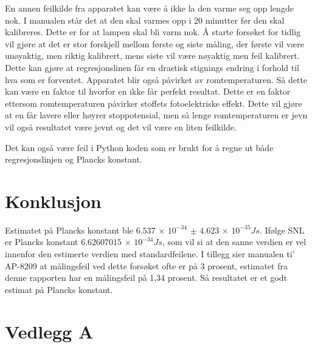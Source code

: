 \documentclass[twocolumn, 11pt]{article} %
\begin{document}
En annen feilkilde fra apparatet kan være å ikke la den varme seg opp lengde nok. I manualen står det at den skal varmes opp i 20 minutter før den skal kalibreres. Dette er for at lampen skal bli varm nok. Å starte forsøket for tidlig vil gjøre at det er stor forskjell mellom første og siste måling, der første vil være unøyaktig, men riktig kalibrert, mens siste vil være nøyaktig men feil kalibrert. Dette kan gjøre at regresjonslinen får en drastisk stignings endring i forhold til hva som er forventet.
Apparatet blir også påvirket av romtemperaturen. Så dette kan være en faktor til hvorfor en ikke får perfekt resultat. Dette er en faktor ettersom romtemperaturen påvirker stoffets fotoelektriske effekt. Dette vil gjøre at en får lavere eller høyrer stoppotensial, men så lenge romtemperaturen er jevn vil også resultatet være jevnt og det vil være en liten feilkilde.

Det kan også være feil i Python koden som er brukt for å regne ut både regresjonslinjen og Plancks konstant.

\section{Konklusjon}

Estimatet på Plancks konstant ble $6.537$ × $10^{-34}$ $\pm$ $4.623$ × $10^{-35}\textit{Js}$. Ifølge SNL er Plancks konstant $6.62607015$ × $10^{-34}\textit{Js}$, som vil si at den sanne verdien er vel innenfor den estimerte verdien med standardfeilene\cite{Planckskonstant}. I tillegg sier manualen ti' AP-8209 at målingsfeil ved dette forsøket ofte er på 3 prosent, estimatet fra denne rapporten har en målingsfeil på 1,34 prosent. Så resultatet er et godt estimat på Plancks konstant.

 



\clearpage

\onecolumn
\newpage
\appendix
\section{Vedlegg A}
\label{Python}
\end{document}
